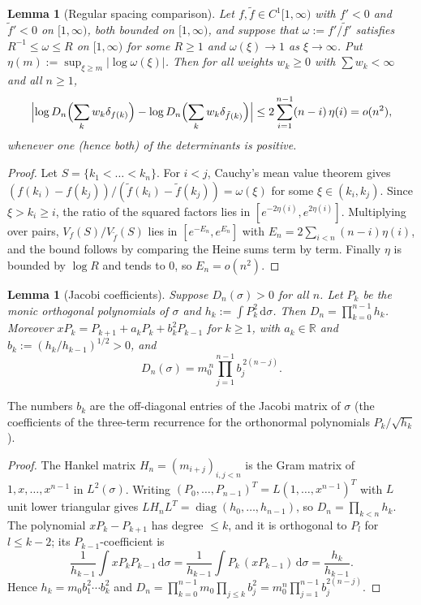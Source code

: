 \documentclass{amsart}
\newtheorem{lemma}[theorem]{Lemma}
\theoremstyle{definition}
\theoremstyle{remark}
\numberwithin{equation}{section}
\newcommand{\R}{\mathbb{R}}
\newcommand{\dd}{\,\mathrm{d}}
\begin{document}
\begin{lemma}[Regular spacing comparison]\label{lem:spacing}
Let $f,\tilde f\in C^1[1,\infty)$ with $f'<0$ and $\tilde f'<0$ on $[1,\infty)$, both bounded on $[1,\infty)$, and suppose that
$\omega:=f'/\tilde f'$ satisfies $R^{-1}\le\omega\le R$ on $[1,\infty)$ for some $R\ge1$ and $\omega(\xi)\to1$ as $\xi\to\infty$.
Put $\eta(m):=\sup_{\xi\ge m}|\log\omega(\xi)|$. Then for all weights $w_k\ge0$ with $\sum w_k<\infty$ and all $n\ge1$,
\[
  \Bigl|\log D_n\Bigl(\sum_kw_k\delta_{f(k)}\Bigr)-\log D_n\Bigl(\sum_kw_k\delta_{\tilde f(k)}\Bigr)\Bigr|
  \le2\sum_{i=1}^{n-1}(n-i)\,\eta(i)=o(n^2),
\]
whenever one (hence both) of the determinants is positive.
\end{lemma}

\begin{proof}
Let $S=\{k_1<\dots<k_n\}$. For $i<j$, Cauchy's mean value theorem gives
$(f(k_i)-f(k_j))/(\tilde f(k_i)-\tilde f(k_j))=\omega(\xi)$ for some $\xi\in(k_i,k_j)$. Since $\xi>k_i\ge i$, the ratio of the
squared factors lies in $[e^{-2\eta(i)},e^{2\eta(i)}]$. Multiplying over pairs, $V_f(S)/V_{\tilde f}(S)$ lies in
$[e^{-E_n},e^{E_n}]$ with $E_n=2\sum_{i<n}(n-i)\eta(i)$, and the bound follows by comparing the Heine sums term by
term. Finally $\eta$ is bounded by $\log R$ and tends to $0$, so $E_n=o(n^2)$.
\end{proof}

\begin{lemma}[Jacobi coefficients]\label{lem:jacobi}
Suppose $D_n(\sigma)>0$ for all $n$. Let $P_k$ be the monic orthogonal polynomials of $\sigma$ and
$h_k:=\int P_k^2\dd\sigma$. Then $D_n=\prod_{k=0}^{n-1}h_k$. Moreover $xP_k=P_{k+1}+a_kP_k+b_k^2P_{k-1}$ for
$k\ge1$, with $a_k\in\R$ and $b_k:=(h_k/h_{k-1})^{1/2}>0$, and
\[
  D_n(\sigma)=m_0^{\,n}\prod_{j=1}^{n-1}b_j^{\,2(n-j)} .
\]
\end{lemma}

The numbers $b_k$ are the off-diagonal entries of the Jacobi matrix of $\sigma$ (the coefficients of the
three-term recurrence for the orthonormal polynomials $P_k/\sqrt{h_k}$).

\begin{proof}
The Hankel matrix $H_n=(m_{i+j})_{i,j<n}$ is the Gram matrix of $1,x,\dots,x^{n-1}$ in $L^2(\sigma)$. Writing
$(P_0,\dots,P_{n-1})^T=L(1,\dots,x^{n-1})^T$ with $L$ unit lower triangular gives
$LH_nL^T=\operatorname{diag}(h_0,\dots,h_{n-1})$, so $D_n=\prod_{k<n}h_k$. The polynomial $xP_k-P_{k+1}$ has degree $\le k$, and it is orthogonal to
$P_l$ for $l\le k-2$; its $P_{k-1}$-coefficient is
\[
  \frac1{h_{k-1}}\int xP_kP_{k-1}\dd\sigma=\frac1{h_{k-1}}\int P_k\,(xP_{k-1})\dd\sigma=\frac{h_k}{h_{k-1}} .
\]
Hence $h_k=m_0b_1^2\cdots b_k^2$ and
$D_n=\prod_{k=0}^{n-1}m_0\prod_{j\le k}b_j^2=m_0^n\prod_{j=1}^{n-1}b_j^{2(n-j)}$.
\end{proof}
\end{document}
